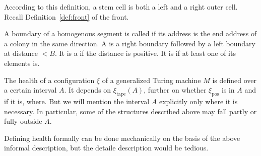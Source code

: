 \documentclass[11pt]{memoir}
\theoremstyle{definition} %
\newcommand{\fld}[1]{\ensuremath{\textit{#1\/}}}
\def\B{B}
\newcommand{\pos}{\mathrm{pos}}
\newcommand{\Drift}{\fld{Drift}}
\newcommand{\tape}{\mathrm{tape}}
\begin{document}
According to this definition, a stem cell is both a left and a right outer cell.
Recall Definition~\ref{def:front} of the front.


\begin{definition}[Boundaries]%

A boundary of a homogenous segment is called  if its address is the end 
address of a colony in the same direction.
A  
is a right boundary followed by a left boundary at distance \( <\B \).
It is a  if the distance is positive.
It is  if at least one of its elements is.
\end{definition}

The health of a configuration \( \xi \) of a generalized Turing machine 
\( M \) is defined over a certain interval \( A \).
It depends on \( \xi_{\tape}(A) \), further on whether \( \xi_{\pos} \) is in \( A \) and
if it is, where.
But we will mention the interval \( A \) explicitly only where it is necessary.
In particular, some of the structures described above may fall partly or fully
outside \( A \).

Defining health formally can be done mechanically on the basis of the above informal description,
but the detaile description would be tedious.


\end{document}

